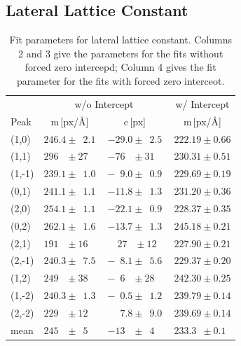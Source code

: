 \documentclass[a4paper,10pt]{scrartcl}
\begin{document}
\subsection{Lateral Lattice Constant}

\begin{table}
\begin{center}
\begin{tabular}{lccc}
\toprule
       & \multicolumn{2}{c}{w/o Intercept}                                                     & w/ Intercept      \\
\cmidrule(r){2-4}
Peak   & m\,[px/\AA]                          & c\,[px]                                        & m\,[px/\AA]       \\
\midrule
(1,0)  & $246.4 \pm \phantom{0}2.1$           & $-29.0 \pm \phantom{0}2.5$                     & $222.19 \pm 0.66$ \\ 
(1,1)  & $296\phantom{.0} \pm 27\phantom{.0}$ & $-76\phantom{.0} \pm 31\phantom{.0}$           & $230.31 \pm 0.51$ \\ 
(1,-1) & $239.1 \pm \phantom{0}1.0$           & $-\phantom{0}9.0 \pm \phantom{0}0.9$           & $229.69 \pm 0.19$ \\ 
(0,1)  & $241.1 \pm \phantom{0}1.1$           & $-11.8 \pm \phantom{0}1.3$                     & $231.20 \pm 0.36$ \\ 
(2,0)  & $254.1 \pm \phantom{0}1.1$           & $-22.1 \pm \phantom{0}0.9$                     & $228.37 \pm 0.35$ \\ 
(0,2)  & $262.1 \pm \phantom{0}1.6$           & $-13.7 \pm \phantom{0}1.3$                     & $245.18 \pm 0.21$ \\ 
(2,1)  & $191\phantom{.0} \pm 16\phantom{.0}$ & $\phantom{-}27\phantom{.0} \pm 12\phantom{.0}$ & $227.90 \pm 0.21$ \\ 
(2,-1) & $240.3 \pm \phantom{0}7.5$           & $-\phantom{0}8.1 \pm \phantom{0}5.6$           & $229.37 \pm 0.20$ \\ 
(1,2)  & $249\phantom{.0} \pm 38\phantom{.0}$ & $-\phantom{0}6\phantom{.0} \pm 28\phantom{.0}$ & $242.30 \pm 0.25$ \\ 
(1,-2) & $240.3 \pm \phantom{0}1.3$           & $-\phantom{0}0.5 \pm \phantom{0}1.2$           & $239.79 \pm 0.14$ \\ 
(2,-2) & $229\phantom{.0} \pm 12\phantom{.0}$ & $\phantom{-0}7.8 \pm \phantom{0}9.0$           & $239.69 \pm 0.14$ \\ 
mean   & $245\phantom{.0} \pm \phantom{0}5\phantom{.0}$ & $-13\phantom{.0} \pm \phantom{0}4\phantom{.0}$ & $233.3\phantom{0} \pm 0.1\phantom{0}$ \\ 
\bottomrule
\end{tabular}
\end{center}
\par
\caption{Fit parameters for lateral lattice constant. Columns 2 and 3 give the parameters for the fits without forced zero intercepd; Column 4 gives the fit parameter for the fits with forced zero interceot.\label{tab:calibdata}}
\end{table}
\end{document}
